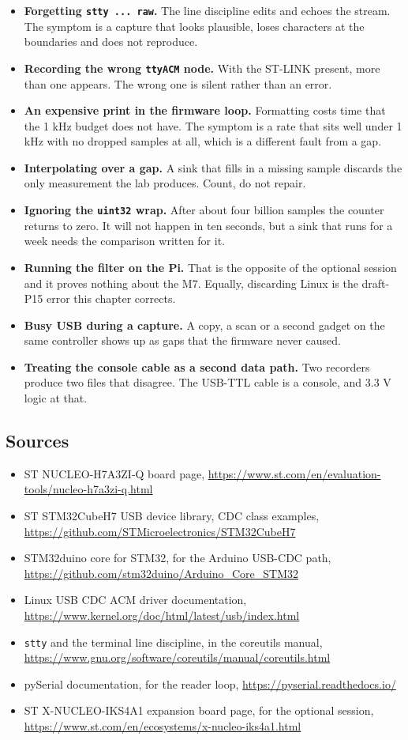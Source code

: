 \begin{itemize}
\item \textbf{Forgetting \texttt{stty ... raw}.} The line discipline edits and echoes the
stream. The symptom is a capture that looks plausible, loses characters at the boundaries
and does not reproduce.
\item \textbf{Recording the wrong \texttt{ttyACM} node.} With the ST-LINK present, more
than one appears. The wrong one is silent rather than an error.
\item \textbf{An expensive print in the firmware loop.} Formatting costs time that the
1 kHz budget does not have. The symptom is a rate that sits well under 1 kHz with no
dropped samples at all, which is a different fault from a gap.
\item \textbf{Interpolating over a gap.} A sink that fills in a missing sample discards the
only measurement the lab produces. Count, do not repair.
\item \textbf{Ignoring the \texttt{uint32} wrap.} After about four billion samples the
counter returns to zero. It will not happen in ten seconds, but a sink that runs for a week
needs the comparison written for it.
\item \textbf{Running the filter on the Pi.} That is the opposite of the optional session
and it proves nothing about the M7. Equally, discarding Linux is the draft-P15 error this
chapter corrects.
\item \textbf{Busy USB during a capture.} A copy, a scan or a second gadget on the same
controller shows up as gaps that the firmware never caused.
\item \textbf{Treating the console cable as a second data path.} Two recorders produce two
files that disagree. The USB-TTL cable is a console, and 3.3 V logic at that.
\end{itemize}

\subsection*{Sources}

\begin{itemize}
\item ST NUCLEO-H7A3ZI-Q board page,
\url{https://www.st.com/en/evaluation-tools/nucleo-h7a3zi-q.html}
\item ST STM32CubeH7 USB device library, CDC class examples,
\url{https://github.com/STMicroelectronics/STM32CubeH7}
\item STM32duino core for STM32, for the Arduino USB-CDC path,
\url{https://github.com/stm32duino/Arduino_Core_STM32}
\item Linux USB CDC ACM driver documentation,
\url{https://www.kernel.org/doc/html/latest/usb/index.html}
\item \texttt{stty} and the terminal line discipline, in the coreutils manual,
\url{https://www.gnu.org/software/coreutils/manual/coreutils.html}
\item pySerial documentation, for the reader loop,
\url{https://pyserial.readthedocs.io/}
\item ST X-NUCLEO-IKS4A1 expansion board page, for the optional session,
\url{https://www.st.com/en/ecosystems/x-nucleo-iks4a1.html}
\end{itemize}
